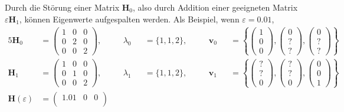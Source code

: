 Durch die Störung einer Matrix $\bm H_0$, also durch Addition einer geeigneten Matrix $\varepsilon \bm H_1$, können Eigenwerte aufgespalten werden.
Als Beispiel, wenn $\varepsilon = 0.01$,
\begin{alignat}{5}
    \bm H_0 &=
    \begin{pmatrix}
        1 & 0 & 0\\
        0 & 2 & 0\\
        0 & 0 & 2
    \end{pmatrix},
    \quad
    && \lambda_0 &&= \{1, 1, 2\},
    \quad
    && \bm v_0 &&= \left\{
    \begin{pmatrix}
        1\\
        0\\
        0
    \end{pmatrix},
    \begin{pmatrix}
        0\\
        ?\\
        ?
    \end{pmatrix},
    \begin{pmatrix}
        0\\
        ?\\
        ?
    \end{pmatrix}
    \right\}
    \\
    \bm H_1 &=
    \begin{pmatrix}
        1 & 0 & 0\\
        0 & 1 & 0\\
        0 & 0 & 2
    \end{pmatrix},
    \quad
    && \lambda_1 &&= \{1, 1, 2\},
    \quad
    && \bm v_1 &&= \left\{
    \begin{pmatrix}
        ?\\
        ?\\
        0
    \end{pmatrix},
    \begin{pmatrix}
        ?\\
        ?\\
        0
    \end{pmatrix},
    \begin{pmatrix}
        0\\
        0\\
        1
    \end{pmatrix}
    \right\}
    \\
    \bm H(\varepsilon) &=
    \begin{pmatrix}
        1.01 & 0 & 0\\

\end{pmatrix}
\end{alignat}
